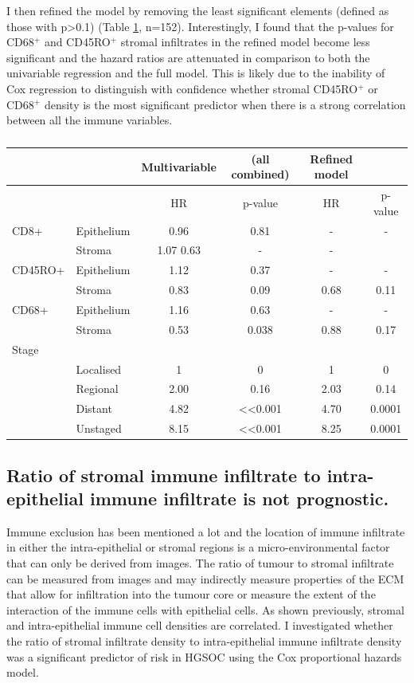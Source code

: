 I then refined the model by removing the least significant elements (defined as those with p>0.1) (Table \ref{tab:cox_combined}, n=152). Interestingly, I found that the p-values for CD68$^+$ and CD45RO$^+$ stromal infiltrates in the refined model become less significant and the hazard ratios are attenuated in comparison to both the univariable regression and the full model. This is likely due to the inability of Cox regression to distinguish with confidence whether stromal CD45RO$^+$ or CD68$^+$ density is the most significant predictor when there is a strong correlation between all the immune variables.
\begin{table}[]
    \centering
    \begin{tabular}{llcccc} \hline
&&	Multivariable & (all combined) &	Refined model &\\ \hline
	&&	HR&	p-value&	HR&	p-value\\
CD8+&	Epithelium&	0.96&	0.81&	-	&-\\
	&Stroma&	1.07	0.63	&-&	-\\
CD45RO+&	Epithelium&	1.12&	0.37	&-&	-\\
	&Stroma	&0.83	&0.09	&0.68&	0.11\\
CD68+&	Epithelium&	1.16&	0.63	&-&	-\\
	&Stroma	&0.53&	0.038&	0.88	&0.17\\
Stage &&&&&\\
&Localised&	1&	0&	1&	0\\
&	Regional&	2.00&	0.16&	2.03&	0.14\\
&	Distant&	4.82&	<<0.001&	4.70&	0.0001\\
&	Unstaged	&8.15&	<<0.001&	8.25&	0.0001\\ \hline

    \end{tabular}
    \caption{}
    \label{tab:cox_combined}
\end{table}

\subsection{Ratio of stromal immune infiltrate to intra-epithelial immune infiltrate is not prognostic.}

Immune exclusion has been mentioned a lot and the location of immune infiltrate in either the intra-epithelial or stromal regions is a micro-environmental factor that can only be derived from images. The ratio of tumour to stromal infiltrate can be measured from images and may indirectly measure properties of the ECM that allow for infiltration into the tumour core or measure the extent of the interaction of the immune cells with epithelial cells. As shown previously, stromal and intra-epithelial immune cell densities are correlated. I investigated whether the ratio of stromal infiltrate density to intra-epithelial immune infiltrate density was a significant predictor of risk in HGSOC using the Cox proportional hazards model.

